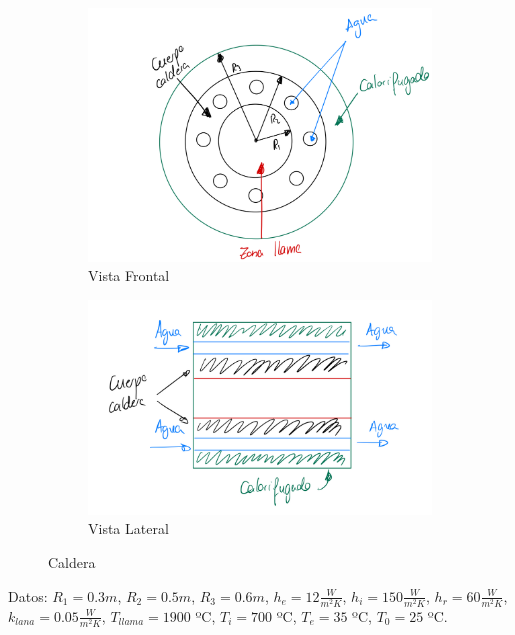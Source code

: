 \documentclass[12pt]{article}
\begin{document}
\begin{figure}[!h]
    \centering
    \begin{subfigure}[b]{0.45 \linewidth}
    \includegraphics[width=\linewidth]{frontal_caldera.jpeg}
    \caption{Vista Frontal}
    \label{fig:westminster_lateral}
    \end{subfigure}
    \begin{subfigure}[b]{0.45 \linewidth}
    \includegraphics[width=\linewidth]{perfil_caldera.jpeg}
    \caption{Vista Lateral}
    \label{fig:westminster_aerea}
    \end{subfigure}
    \caption{Caldera}
    \label{fig:westminster}
   \label{fig:Caldera }
\end{figure}

Datos: $R _{1} = 0.3m$, $R _{2}=0.5m$, $R _{3}=0.6m$, $h _{e}= 12 \frac{W}{m ^{2}K}$, $h _{i}= 150 \frac{W}{m ^{2}K}$, $h _{r}= 60 \frac{W}{m ^{2}K}$, $k _{lana}= 0.05 \frac{W}{m ^{2}K}$, $T _{llama} = 1900$ ºC, $T _{i}= 700$ ºC, $T _{e}= 35$ ºC, $T _{0}= 25$ ºC.
\end{document}
